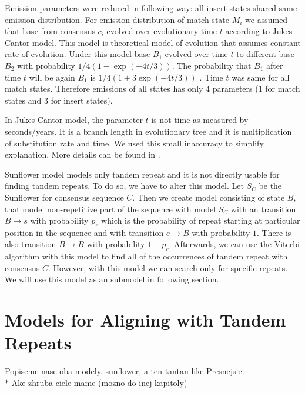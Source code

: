 Emission parameters were reduced in following way: all insert states shared
same emission distribution. For emission distribution of match state $M_i$ we
assumed that base from consensus $c_i$ evolved over evolutionary time $t$
according to Jukes-Cantor model. This model is theoretical model of evolution
that assumes constant rate of evolution. Under this model base $B_1$ evolved
over time $t$ to different base $B_2$  with probability $1/4(1-\exp(-4t/3))$.
The probability that $B_1$ after time $t$ will be again $B_1$ is
$1/4(1+3\exp(-4t/3))$ \cite{Durbin1998}. Time $t$ was same for all match
states. Therefore emissions of all states has only $4$ parameters ($1$ for
match states and $3$ for insert states).

\begin{note}
In Jukes-Cantor model, the parameter $t$ is not time as measured by
seconds/years. It is a branch length in evolutionary tree and it is
multiplication of substitution rate and time. We used this small inaccuracy to
simplify explanation.  More details can be found in \cite{Durbin1998}.

\end{note}

Sunflower model models only tandem repeat and it is not directly usable for
finding tandem repeats. To do so, we have to alter this model. Let $S_C$ be the
Sunflower for consensus sequence $C$. Then we create model consisting of state
$B$, that model non-repetitive part of the sequence with model $S_C$ with an
transition $B\to s$ with probability $p_r$ which is the probability of repeat
starting at particular position in the sequence and with transition $e\to B$
with probability $1$. There is also transition $B\to B$ with probability
$1-p_r$. Afterwards, we can use the Viterbi algorithm with this model to find
all of the occurrences of tandem repeat with consensus $C$. However, with this
model we can search only for specific repeats. We will use this model as an
submodel in following section. 


\section{Models for Aligning with Tandem Repeats}\label{SECTION:REPMODELS}
\begin{reformulate*}
Popiseme nase oba modely. sunflower, a ten tantan-like
Presnejsie:\\
$*$ Ake zhruba ciele mame (mozno do inej kapitoly)\\
\end{reformulate*}

